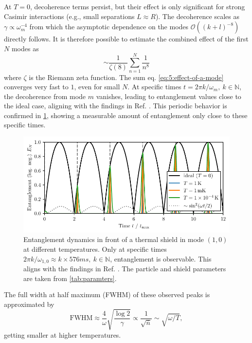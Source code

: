 At $T=0$, decoherence terms persist, but their effect is only significant for strong Casimir interactions (e.g., small separations $L\approx R$).
The decoherence scales as $\gamma \propto \omega_m^{-4}$ from which the asymptotic dependence on the modes $\mathcal{O}((k+l)^{-8})$ directly follows.
It is therefore possible to estimate the combined effect of the first $N$ modes as
\begin{equation}\label{eq:5:effect-of-a-mode}
  \sim \frac{1}{\zeta(8)} \sum_{n=1}^{N} \frac{1}{n^8}
\end{equation}
where $\zeta$ is the Riemann zeta function. The sum eq. \eqref{eq:5:effect-of-a-mode} converges very fast to $1$, even for small $N$.
At specific times $t=2\pi k/\omega_m, \ k\in\mathbb{N}$, the decoherence from mode $m$ vanishes, leading to entanglement values close to the ideal case, aligning with the findings in Ref. \cite{Pedernales_2022}.
This periodic behavior is confirmed in \cref{fig:5:entanglement-time-single-mode}, showing a measurable amount of entanglement only close to these specific times.
\begin{figure}[!htbp]
  \centering
  \includegraphics[width=\textwidth]{./../figures/vibrations/entanglement-hamiltonian.pdf}
  \caption{Entanglement dynamics in front of a thermal shield in mode $(1,0)$ at different temperatures. Only at specific times $2\pi k / \omega_{1,0} \approx k\times 576\si{ms},\ k\in\mathbb{N}$, entanglement is observable. This aligns with the findings in Ref. \cite{Pedernales_2022}. The particle and shield parameters are taken from \cref{tab:paramters}.}
  \label{fig:5:entanglement-time-single-mode}
\end{figure}
The full width at half maximum (FWHM) of these observed peaks is approximated by
\begin{equation}
  \mathrm{FWHM} \approx \frac{4}{\omega}\sqrt{\frac{\log 2}{\gamma}} \propto \frac{1}{\sqrt{\bar{n}}} \sim \sqrt{\omega/T},
\end{equation}
getting smaller at higher temperatures.

